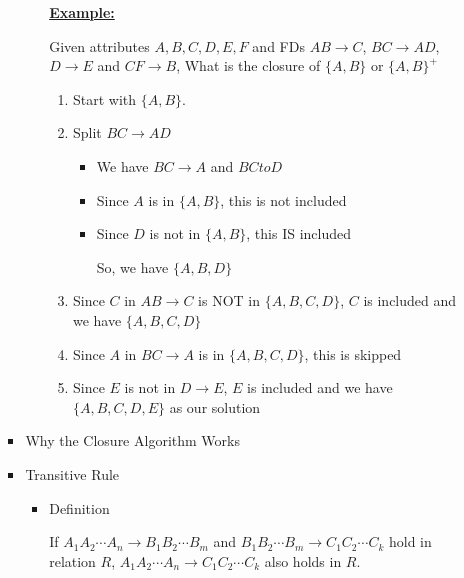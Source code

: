 \documentclass[12pt]{article}
\begin{document}
\begin{enumerate}[1.]
\begin{enumerate}[a)]
\begin{itemize}
\begin{itemize}
                \bigskip

                \underline{\textbf{Example:}}

                \bigskip


                Given attributes $A,B,C,D,E,F$ and FDs $AB \to C$, $BC \to AD$, $D \to E$
                and $CF \to B$, What is the closure of $\{A,B\}$ or $\{A,B\}^+$

                \bigskip

                \begin{enumerate}[1.]
                    \item Start with $\{A,B\}$.
                    \item Split $BC \to AD$
                    \begin{itemize}
                        \item We have $BC \to A$ and $BC to D$
                        \item Since $A$ is in $\{A,B\}$, this is not included
                        \item Since $D$ is not in  $\{A,B\}$, this IS included

                        \bigskip

                        So, we have $\{A,B,D\}$
                    \end{itemize}
                    \item Since $C$ in $AB \to C$ is NOT in $\{A,B,C,D\}$, $C$ is included and we have $\{A,B,C,D\}$
                    \item Since $A$ in $BC \to A$ is in $\{A,B,C,D\}$, this is skipped
                    \item Since $E$ is not in $D \to E$, $E$ is included and we have $\{A,B,C,D,E\}$
                    as our solution
                \end{enumerate}
            \end{itemize}

            \item Why the Closure Algorithm Works
            \item Transitive Rule
            \begin{itemize}
                \item Definition

                \bigskip

                If $A_1A_2 \cdots A_n \to B_1B_2 \cdots B_m$ and $B_1B_2 \cdots B_m \to C_1C_2 \cdots C_k$
                hold in relation $R$, $A_1A_2 \cdots A_n \to C_1C_2 \cdots C_k$ also holds in $R$.


\end{itemize}
\end{itemize}
\end{enumerate}
\end{enumerate}
\end{document}
